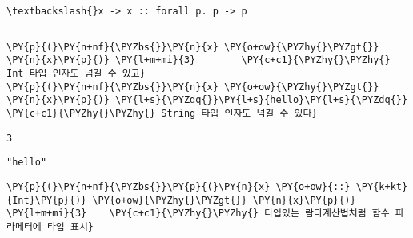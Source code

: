     
    \begin{Verbatim}[commandchars=\\\{\}]
\textbackslash{}x -> x :: forall p. p -> p
    \end{Verbatim}

    
    
    \begin{Verbatim}[commandchars=\\\{\}]

    \end{Verbatim}

    
    \begin{tcolorbox}[breakable, size=fbox, boxrule=1pt, pad at break*=1mm,colback=cellbackground, colframe=cellborder, top=.75ex]
\begin{Verbatim}[commandchars=\\\{\}]
\PY{p}{(}\PY{n+nf}{\PYZbs{}}\PY{n}{x} \PY{o+ow}{\PYZhy{}\PYZgt{}} \PY{n}{x}\PY{p}{)} \PY{l+m+mi}{3}        \PY{c+c1}{\PYZhy{}\PYZhy{} Int 타입 인자도 넘길 수 있고}
\PY{p}{(}\PY{n+nf}{\PYZbs{}}\PY{n}{x} \PY{o+ow}{\PYZhy{}\PYZgt{}} \PY{n}{x}\PY{p}{)} \PY{l+s}{\PYZdq{}}\PY{l+s}{hello}\PY{l+s}{\PYZdq{}}  \PY{c+c1}{\PYZhy{}\PYZhy{} String 타입 인자도 넘길 수 있다}
\end{Verbatim}
\end{tcolorbox}

    
    \begin{Verbatim}[commandchars=\\\{\}]
3
    \end{Verbatim}

    
    
    \begin{Verbatim}[commandchars=\\\{\}]
"hello"
    \end{Verbatim}

    
    \begin{tcolorbox}[breakable, size=fbox, boxrule=1pt, pad at break*=1mm,colback=cellbackground, colframe=cellborder, top=.75ex]
\begin{Verbatim}[commandchars=\\\{\}]
\PY{p}{(}\PY{n+nf}{\PYZbs{}}\PY{p}{(}\PY{n}{x} \PY{o+ow}{::} \PY{k+kt}{Int}\PY{p}{)} \PY{o+ow}{\PYZhy{}\PYZgt{}} \PY{n}{x}\PY{p}{)} \PY{l+m+mi}{3}    \PY{c+c1}{\PYZhy{}\PYZhy{} 타입있는 람다계산법처럼 함수 파라메터에 타입 표시}
\end{Verbatim}
\end{tcolorbox}

